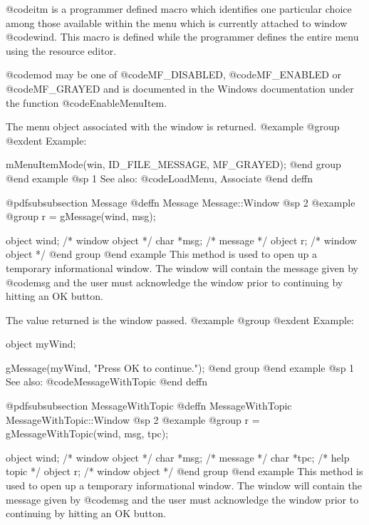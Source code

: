 @code{itm} is a programmer defined macro which identifies one particular
choice among those available within the menu which is currently attached
to window @code{wind}.  This macro is defined while the programmer defines
the entire menu using the resource editor.

@code{mod} may be one of @code{MF_DISABLED}, @code{MF_ENABLED} or
@code{MF_GRAYED} and is documented in the Windows documentation under
the function @code{EnableMenuItem}.

The menu object associated with the window is returned.
@example
@group
@exdent Example:

mMenuItemMode(win, ID_FILE_MESSAGE, MF_GRAYED);
@end group
@end example
@sp 1
See also:  @code{LoadMenu, Associate}
@end deffn











@pdfsubsubsection {Message}
@deffn {Message} Message::Window
@sp 2
@example
@group
r = gMessage(wind, msg);

object  wind;   /*  window object  */
char    *msg;   /*  message        */
object  r;      /*  window object  */
@end group
@end example
This method is used to open up a temporary informational window.  The
window will contain the message given by @code{msg} and the user must
acknowledge the window prior to continuing by hitting an OK button.


The value returned is the window passed.
@example
@group
@exdent Example:

object  myWind;

gMessage(myWind, "Press OK to continue.");
@end group
@end example
@sp 1
See also:  @code{MessageWithTopic}
@end deffn












@pdfsubsubsection {MessageWithTopic}
@deffn {MessageWithTopic} MessageWithTopic::Window
@sp 2
@example
@group
r = gMessageWithTopic(wind, msg, tpc);

object  wind;   /*  window object  */
char    *msg;   /*  message        */
char    *tpc;   /*  help topic     */
object  r;      /*  window object  */
@end group
@end example
This method is used to open up a temporary informational window.  The
window will contain the message given by @code{msg} and the user must
acknowledge the window prior to continuing by hitting an OK button.

